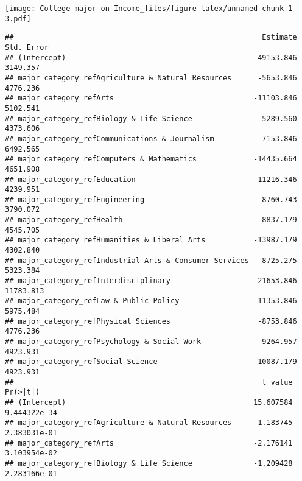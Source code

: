 \documentclass[
]{article}
\newenvironment{Shaded}{\begin{snugshade}}{\end{snugshade}}
\newcommand{\AttributeTok}[1]{\textcolor[rgb]{0.77,0.63,0.00}{#1}}
\newcommand{\FunctionTok}[1]{\textcolor[rgb]{0.00,0.00,0.00}{#1}}
\newcommand{\NormalTok}[1]{#1}
\newcommand{\OtherTok}[1]{\textcolor[rgb]{0.56,0.35,0.01}{#1}}
\newcommand{\SpecialCharTok}[1]{\textcolor[rgb]{0.00,0.00,0.00}{#1}}
\newcommand{\StringTok}[1]{\textcolor[rgb]{0.31,0.60,0.02}{#1}}
\begin{document}
\texttt{[image: College-major-on-Income\_files/figure-latex/unnamed-chunk-1-3.pdf]}

\begin{Shaded}
\end{Shaded}

\begin{verbatim}
##                                                         Estimate Std. Error
## (Intercept)                                            49153.846   3149.357
## major_category_refAgriculture & Natural Resources      -5653.846   4776.236
## major_category_refArts                                -11103.846   5102.541
## major_category_refBiology & Life Science               -5289.560   4373.606
## major_category_refCommunications & Journalism          -7153.846   6492.565
## major_category_refComputers & Mathematics             -14435.664   4651.908
## major_category_refEducation                           -11216.346   4239.951
## major_category_refEngineering                          -8760.743   3790.072
## major_category_refHealth                               -8837.179   4545.705
## major_category_refHumanities & Liberal Arts           -13987.179   4302.840
## major_category_refIndustrial Arts & Consumer Services  -8725.275   5323.384
## major_category_refInterdisciplinary                   -21653.846  11783.813
## major_category_refLaw & Public Policy                 -11353.846   5975.484
## major_category_refPhysical Sciences                    -8753.846   4776.236
## major_category_refPsychology & Social Work             -9264.957   4923.931
## major_category_refSocial Science                      -10087.179   4923.931
##                                                         t value     Pr(>|t|)
## (Intercept)                                           15.607584 9.444322e-34
## major_category_refAgriculture & Natural Resources     -1.183745 2.383031e-01
## major_category_refArts                                -2.176141 3.103954e-02
## major_category_refBiology & Life Science              -1.209428 2.283166e-01

\end{verbatim}
\end{document}

